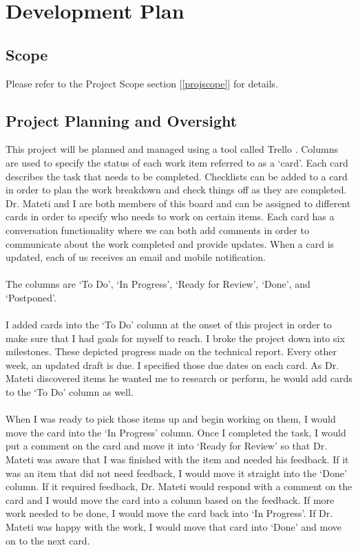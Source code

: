 \chapter{Development Plan}
\label{devplan}

\section{Scope}
Please refer to the Project Scope section [\ref{projscope}] for details.

\section{Project Planning and Oversight}
This project will be planned and managed using a tool called Trello \cite{trello}. Columns are used to specify the status of each work item referred to as a `card'. Each card describes the task that needs to be completed. Checklists can be added to a card in order to plan the work breakdown and check things off as they are completed. Dr. Mateti and I are both members of this board and can be assigned to different cards in order to specify who needs to work on certain items. Each card has a conversation functionality where we can both add comments in order to communicate about the work completed and provide updates. When a card is updated, each of us receives an email and mobile notification. \\\\
The columns are `To Do', `In Progress', `Ready for Review', `Done', and `Postponed'. \\\\
I added cards into the `To Do' column at the onset of this project in order to make sure that I had goals for myself to reach. I broke the project down into six milestones. These depicted progress made on the technical report. Every other week, an updated draft is due. I specified those due dates on each card. As Dr. Mateti discovered items he wanted me to research or perform, he would add cards to the `To Do' column as well. \\\\
When I was ready to pick those items up and begin working on them, I would move the card into the `In Progress' column. Once I completed the task, I would put a comment on the card and move it into `Ready for Review' so that Dr. Mateti was aware that I was finished with the item and needed his feedback. If it was an item that did not need feedback, I would move it straight into the `Done' column. If it required feedback, Dr. Mateti would respond with a comment on the card and I would move the card into a column based on the feedback. If more work needed to be done, I would move the card back into `In Progress'. If Dr. Mateti was happy with the work, I would move that card into `Done' and move on to the next card. \\\\
